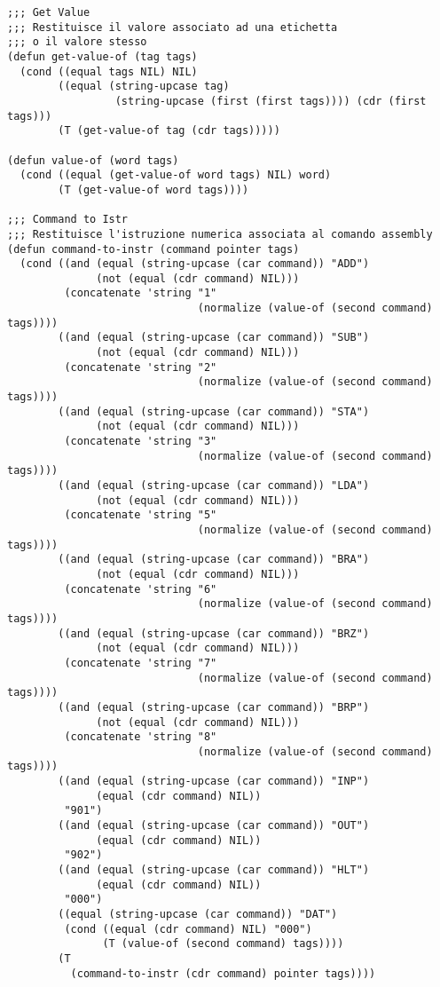 \documentclass[a4paper,12pt, oneside]{book}
\begin{document}
\begin{verbatim}
;;; Get Value
;;; Restituisce il valore associato ad una etichetta
;;; o il valore stesso
(defun get-value-of (tag tags)
  (cond ((equal tags NIL) NIL)
        ((equal (string-upcase tag)
                 (string-upcase (first (first tags)))) (cdr (first tags)))
        (T (get-value-of tag (cdr tags)))))

(defun value-of (word tags)
  (cond ((equal (get-value-of word tags) NIL) word)
        (T (get-value-of word tags))))

;;; Command to Istr
;;; Restituisce l'istruzione numerica associata al comando assembly
(defun command-to-instr (command pointer tags)
  (cond ((and (equal (string-upcase (car command)) "ADD") 
              (not (equal (cdr command) NIL)))
         (concatenate 'string "1" 
                              (normalize (value-of (second command) tags))))
        ((and (equal (string-upcase (car command)) "SUB") 
              (not (equal (cdr command) NIL)))
         (concatenate 'string "2" 
                              (normalize (value-of (second command) tags))))
        ((and (equal (string-upcase (car command)) "STA") 
              (not (equal (cdr command) NIL)))
         (concatenate 'string "3" 
                              (normalize (value-of (second command) tags))))
        ((and (equal (string-upcase (car command)) "LDA") 
              (not (equal (cdr command) NIL)))
         (concatenate 'string "5" 
                              (normalize (value-of (second command) tags))))
        ((and (equal (string-upcase (car command)) "BRA") 
              (not (equal (cdr command) NIL)))
         (concatenate 'string "6" 
                              (normalize (value-of (second command) tags))))
        ((and (equal (string-upcase (car command)) "BRZ") 
              (not (equal (cdr command) NIL)))
         (concatenate 'string "7" 
                              (normalize (value-of (second command) tags))))
        ((and (equal (string-upcase (car command)) "BRP") 
              (not (equal (cdr command) NIL)))
         (concatenate 'string "8" 
                              (normalize (value-of (second command) tags))))
        ((and (equal (string-upcase (car command)) "INP") 
              (equal (cdr command) NIL))
         "901")
        ((and (equal (string-upcase (car command)) "OUT") 
              (equal (cdr command) NIL))
         "902")
        ((and (equal (string-upcase (car command)) "HLT") 
              (equal (cdr command) NIL))
         "000")
        ((equal (string-upcase (car command)) "DAT")
         (cond ((equal (cdr command) NIL) "000")
               (T (value-of (second command) tags))))
        (T
          (command-to-instr (cdr command) pointer tags))))


\end{verbatim}
\end{document}
